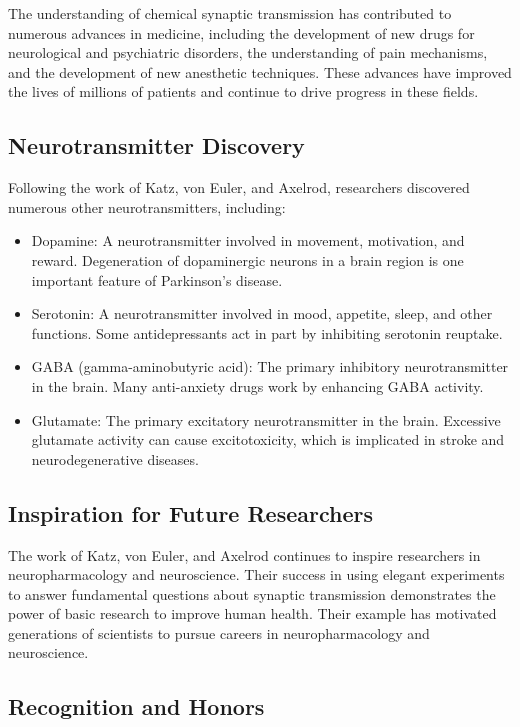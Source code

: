 The understanding of chemical synaptic transmission has contributed to numerous advances in medicine, including the development of new drugs for neurological and psychiatric disorders, the understanding of pain mechanisms, and the development of new anesthetic techniques. These advances have improved the lives of millions of patients and continue to drive progress in these fields.

\subsection{Neurotransmitter Discovery}

Following the work of Katz, von Euler, and Axelrod, researchers discovered numerous other neurotransmitters, including:

\begin{itemize}
\item Dopamine: A neurotransmitter involved in movement, motivation, and reward. Degeneration of dopaminergic neurons in a brain region is one important feature of Parkinson's disease.
\item Serotonin: A neurotransmitter involved in mood, appetite, sleep, and other functions. Some antidepressants act in part by inhibiting serotonin reuptake.
\item GABA (gamma-aminobutyric acid): The primary inhibitory neurotransmitter in the brain. Many anti-anxiety drugs work by enhancing GABA activity.
\item Glutamate: The primary excitatory neurotransmitter in the brain. Excessive glutamate activity can cause excitotoxicity, which is implicated in stroke and neurodegenerative diseases.
\end{itemize}

\subsection{Inspiration for Future Researchers}

The work of Katz, von Euler, and Axelrod continues to inspire researchers in neuropharmacology and neuroscience. Their success in using elegant experiments to answer fundamental questions about synaptic transmission demonstrates the power of basic research to improve human health. Their example has motivated generations of scientists to pursue careers in neuropharmacology and neuroscience.

\subsection{Recognition and Honors}


